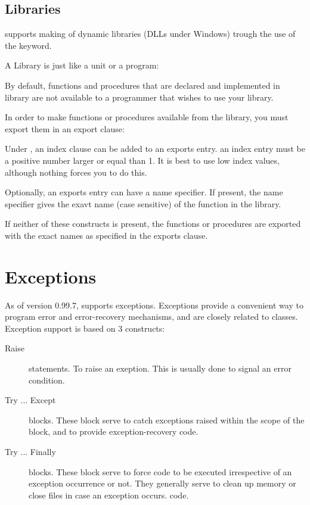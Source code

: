\documentclass{report}
\begin{document}
\section{Libraries}
\fpc supports making of dynamic libraries (DLLs under Windows) trough
the use of the  keyword.

A Library is just like a unit or a program:


By default, functions and procedures that are declared and implemented in
library are not available to a programmer that wishes to use your library.

In order to make functions or procedures available from the library,
you must export them in an export clause:



Under \windowsnt, an index clause can be added to an exports entry.
an index entry must be a positive number larger or equal than 1.
It is best to use low index values, although nothing forces you to 
do this.

Optionally, an exports entry can have a name specifier. If present, the name
specifier gives the exavt name (case sensitive) of the function in the
library.

If neither of these constructs is present, the functions or procedures 
are exported with the exact names as specified in the exports clause.


\chapter{Exceptions}
\label{ch:Exceptions}
As of version 0.99.7, \fpc supports exceptions. Exceptions provide a
convenient way to program error and error-recovery mechanisms, and are
closely related to classes. 
Exception support is based on 3 constructs:
\begin{description}
\item [Raise\ ] statements. To raise an exeption. This is usually done to signal an
error condition.
\item [Try ... Except\ ] blocks. These block serve to catch exceptions
raised within the scope of the block, and to provide exception-recovery 
code.
\item [Try ... Finally\ ] blocks. These block serve to force code to be
executed irrespective of an exception occurrence or not. They generally
serve to clean up memory or close files in case an exception occurs. 
code.
\end{description}
\end{document}
